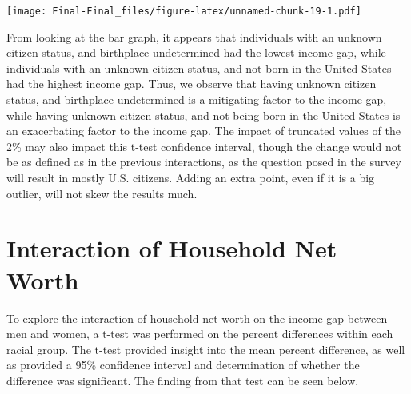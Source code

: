 \documentclass[
]{article}
\begin{document}
\texttt{[image: Final-Final\_files/figure-latex/unnamed-chunk-19-1.pdf]}

From looking at the bar graph, it appears that individuals with an
unknown citizen status, and birthplace undetermined had the lowest
income gap, while individuals with an unknown citizen status, and not
born in the United States had the highest income gap. Thus, we observe
that having unknown citizen status, and birthplace undetermined is a
mitigating factor to the income gap, while having unknown citizen
status, and not being born in the United States is an exacerbating
factor to the income gap. The impact of truncated values of the 2\% may
also impact this t-test confidence interval, though the change would not
be as defined as in the previous interactions, as the question posed in
the survey will result in mostly U.S. citizens. Adding an extra point,
even if it is a big outlier, will not skew the results much.

\hypertarget{interaction-of-household-net-worth}{%
\section{Interaction of Household Net
Worth}\label{interaction-of-household-net-worth}}

To explore the interaction of household net worth on the income gap
between men and women, a t-test was performed on the percent differences
within each racial group. The t-test provided insight into the mean
percent difference, as well as provided a 95\% confidence interval and
determination of whether the difference was significant. The finding
from that test can be seen below.
\end{document}
